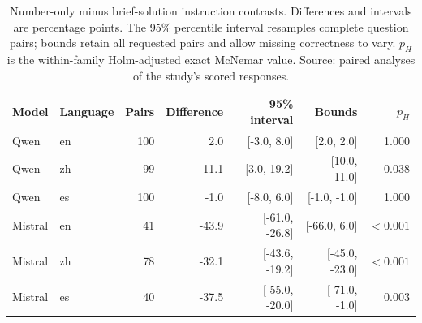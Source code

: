 \begin{table}[ht]
\centering\small
\caption{Number-only minus brief-solution instruction contrasts. Differences and intervals are percentage points. The 95\% percentile interval resamples complete question pairs; bounds retain all requested pairs and allow missing correctness to vary. $p_H$ is the within-family Holm-adjusted exact McNemar value. Source: paired analyses of the study's scored responses.}
\begin{tabular}{llrrrrr}\toprule
Model & Language & Pairs & Difference & 95\% interval & Bounds & $p_H$\\\midrule
Qwen & en & 100 & 2.0 & [-3.0, 8.0] & [2.0, 2.0] & 1.000\\
Qwen & zh & 99 & 11.1 & [3.0, 19.2] & [10.0, 11.0] & 0.038\\
Qwen & es & 100 & -1.0 & [-8.0, 6.0] & [-1.0, -1.0] & 1.000\\
Mistral & en & 41 & -43.9 & [-61.0, -26.8] & [-66.0, 6.0] & $<0.001$\\
Mistral & zh & 78 & -32.1 & [-43.6, -19.2] & [-45.0, -23.0] & $<0.001$\\
Mistral & es & 40 & -37.5 & [-55.0, -20.0] & [-71.0, -1.0] & 0.003\\
\bottomrule
\end{tabular}\label{tab:fresh-format}
\end{table}
